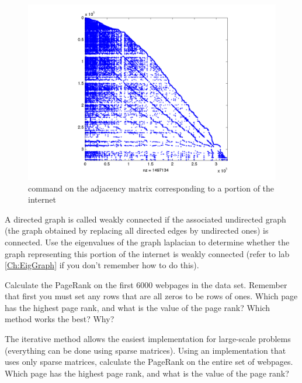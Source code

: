 \begin{figure}
\begin{center}
\includegraphics[scale = .4]{./Figures/WebSparse.pdf}
\caption{ command on the adjacency matrix corresponding to a portion of the internet}
\label{Fig:WebSparse}
\end{center}
\end{figure}

\begin{problem}
\label{prob:pg_undirected}
A directed graph is called weakly connected if the associated undirected graph (the graph obtained by replacing all directed edges by undirected ones) is connected. Use the eigenvalues of the graph laplacian to determine whether the graph representing this portion of the internet is weakly connected (refer to lab \ref{Ch:EigGraph} if you don't remember how to do this).
\end{problem}

\begin{problem}
\label{prob:pg_calc}
Calculate the PageRank on the first 6000 webpages in the data set. Remember that first you must set any rows that are all zeros to be rows of ones. Which page has the highest page rank, and what is the value of the page rank? Which method works the best? Why?
\end{problem}

\begin{problem}
The iterative method allows the easiest implementation for large-scale problems (everything can be done using sparse matrices). Using an implementation that uses only sparse matrices, calculate the PageRank on the entire set of webpages. Which page has the highest page rank, and what is the value of the page rank?
\end{problem}


